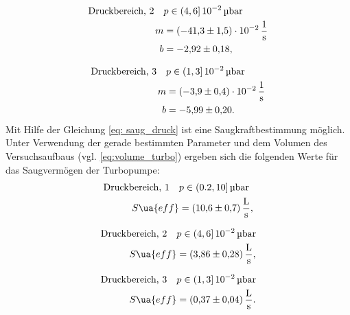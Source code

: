 \begin{align}
  \label{eq: regression_turbo_druck_2}
  \begin{aligned}
  \text{Druckbereich, 2} \quad  &p\in(4,6]\,\num{e-2}\,\si{\micro\bar} \\
  m&=\SI{-41.3\pm1.5 e-2}{\per\second} \\
  b&=\num{-2.92 \pm0.18 },
\end{aligned}
\end{align}

\begin{align}
  \label{eq: regression_turbo_druck_3}
  \begin{aligned}
  \text{Druckbereich, 3} \quad  &p\in(1,3]\,\num{e-2}\,\si{\micro\bar} \\
  m&=\SI{-3.9\pm0.4 e-2}{\per\second} \\
  b&=\num{-5.99 \pm0.20 }.
\end{aligned}
\end{align}
Mit Hilfe der Gleichung \eqref{eq: saug_druck} ist eine Saugkraftbestimmung möglich. %
Unter Verwendung der gerade bestimmten Parameter und dem Volumen des Versuchsaufbaus
(vgl. \eqref{eq:volume_turbo}) ergeben sich die folgenden Werte für das Saugvermögen der Turbopumpe:
\begin{align}
  \label{eq:turbo_saug_1}
  \begin{aligned}
    \text{Druckbereich, 1} \quad  &p\in(0.2,10]\,\si{\micro\bar} \\
   S\ua{eff}&=\SI{10.6\pm 0.7}{\litre\per\second},
\end{aligned}
\end{align}

\begin{align}
  \label{eq:turbo_saug_2}
  \begin{aligned}
  \text{Druckbereich, 2} \quad  &p\in(4,6]\,\num{e-2}\,\si{\micro\bar} \\
   S\ua{eff}&=\SI{3.86\pm 0.28}{\litre\per\second},
\end{aligned}
\end{align}

\begin{align}
  \label{eq:turbo_saug_3}
  \begin{aligned}
    \text{Druckbereich, 3} \quad  &p\in(1,3]\,\num{e-2}\,\si{\micro\bar} \\
   S\ua{eff}&=\SI{0.37\pm 0.04}{\litre\per\second}.
\end{aligned}
\end{align}

